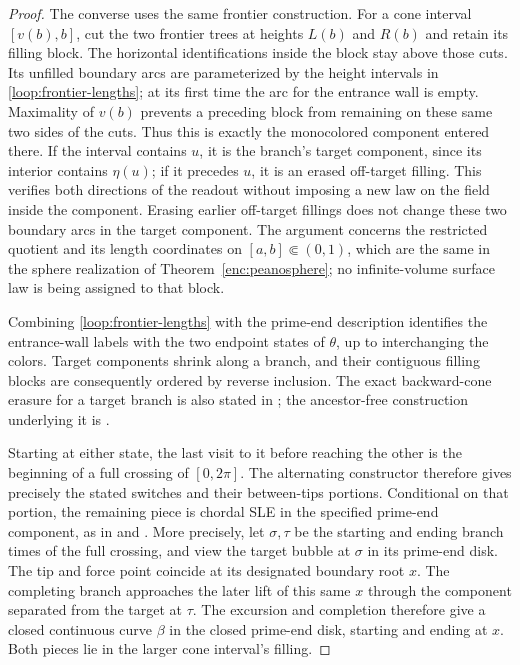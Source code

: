 \begin{proof}
The converse uses the same frontier construction.  For a cone interval
$[v(b),b]$, cut the two frontier trees at heights $L(b)$ and $R(b)$
and retain its filling block.  The horizontal identifications inside
the block stay above those cuts.  Its unfilled boundary arcs are
parameterized by the height intervals in
\eqref{loop:frontier-lengths}; at its first time the arc for the
entrance wall is empty.  Maximality of $v(b)$ prevents a preceding
block from remaining on these same two sides of the cuts.  Thus this
is exactly the monocolored component entered there.  If the interval
contains $u$, it is the branch's target component, since its interior
contains $\eta(u)$; if it precedes $u$, it is an erased off-target
filling.  This verifies both directions of the readout without imposing
a new law on the field inside the component.  Erasing earlier
off-target fillings does not change these two boundary arcs in the
target component.  The argument concerns the restricted quotient and
its length coordinates on $[a,b]\Subset(0,1)$, which are the same
in the sphere realization of Theorem~\ref{enc:peanosphere}; no
infinite-volume surface law is being assigned to that block.

Combining \eqref{loop:frontier-lengths} with the prime-end description
identifies the entrance-wall labels with the two endpoint states of
$\theta$, up to interchanging the colors.  Target components shrink
along a branch, and their contiguous filling blocks are consequently
ordered by reverse inclusion.  The exact backward-cone erasure for a
target branch is also stated in
\cite[Section~4.2 and Definition~4.14]{AruHoldenPowellSunCritical};
the ancestor-free construction underlying it is
\cite[Proposition~1.13 and Lemma~10.4]{DMSMating}.

Starting at either state, the last visit to it before reaching the other
is the beginning of a full crossing of $[0,2\pi]$.  The alternating
constructor therefore gives precisely the stated switches and their
between-tips portions.  Conditional on that portion, the remaining
piece is chordal SLE in the specified prime-end component, as in
\cite[Section~2.1.6]{AruHoldenPowellSunCritical} and
\cite[Section~2.3.2]{GwynneMillerQianCLE}.  More precisely, let
$\sigma,\tau$ be the starting and ending branch times of the full
crossing, and view the target bubble at $\sigma$ in its prime-end disk.
The tip and force point coincide at its designated boundary root $x$.
The completing branch approaches the later lift of this same $x$
through the component separated from the target at $\tau$.  The
excursion and completion therefore give a closed continuous curve
$\beta$ in the closed prime-end disk, starting and ending at $x$.
Both pieces lie in the larger cone interval's filling.


\end{proof}
